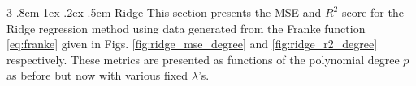 \documentclass[%
reprint,
amsmath,amssymb,
aps,
pra,
]{revtex4-2}
\makeatletter
\renewcommand{\subsubsection}{%
	\@startsection
	{subsubsection}%
	{3}%
	{\z@}%
	{.8cm \@plus1ex \@minus .2ex}%
	{.5cm}%
	{\normalfont\small\centering}%
}
\makeatother
\begin{document}
%

\subsubsection{Ridge}
This section presents the MSE and \(R^2\)-score for the Ridge regression method using data generated from the Franke function \eqref{eq:franke} given in Figs. \ref{fig:ridge_mse_degree} and \ref{fig:ridge_r2_degree} respectively. These metrics are presented as functions of the polynomial degree \(p\) as before but now with various fixed \(\lambda \)'s. 
\end{document}
